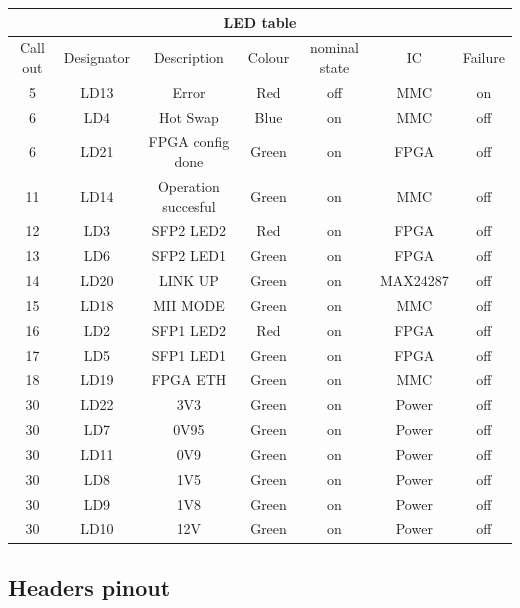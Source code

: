 \begin{longtable}{|c|c|c|c|c|c|c|} \hline
		\multicolumn{7}{|c|}{LED table }\\ \hline
	Call out & Designator & Description&  Colour &nominal state& IC &Failure\\ \hline
	5 & LD13 & Error &Red & off &MMC & on \\ \hline
	6 & LD4 & Hot Swap & Blue & on&  MMC &  off\\ \hline
	6 & LD21 & FPGA config done & Green & on& FPGA &off \\ \hline 
	11 & LD14 & Operation succesful& Green & on& MMC &off\\ \hline
	12 & LD3 & SFP2 LED2 & Red &on& FPGA & off\\ \hline
	13 & LD6 & SFP2 LED1 & Green &on & FPGA&off \\ \hline
	14 & LD20 & LINK UP &  Green &on & MAX24287&off \\ \hline
	15 & LD18 & MII MODE & Green & on& MMC&off \\ \hline
	16 & LD2 & SFP1 LED2 & Red & on& FPGA &off\\ \hline
	17& LD5 & SFP1 LED1 & Green &on & FPGA& off\\ \hline
	18 & LD19 & FPGA ETH & Green &on & MMC &off\\ \hline
	30 & LD22 & 3V3 & Green & on & Power & off \\ \hline
	30 & LD7 & 0V95 & Green & on & Power & off \\ \hline 
	30 & LD11 & 0V9 & Green & on & Power & off \\ \hline 
	30 & LD8 & 1V5 & Green & on & Power & off \\ \hline 
	30 & LD9 & 1V8 & Green & on & Power & off \\ \hline 
	30 & LD10 & 12V & Green & on & Power & off \\ \hline  
\end{longtable}

\subsection{Headers pinout}

